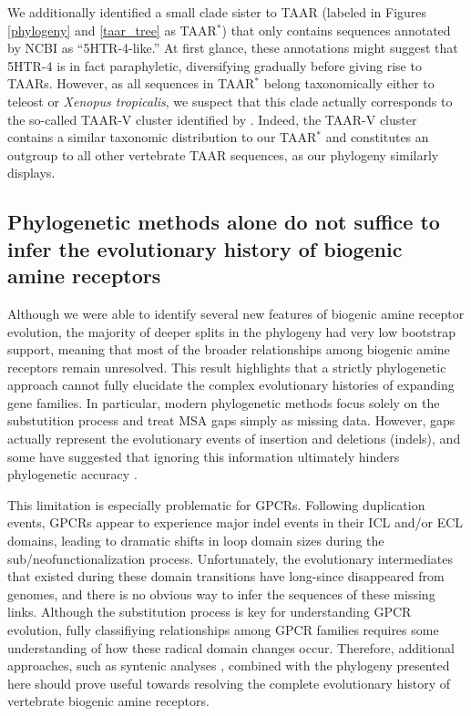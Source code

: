 \documentclass[fleqn,10pt]{wlpeerj}
\begin{document}
We additionally identified a small clade sister to TAAR (labeled in Figures \ref{phylogeny} and \ref{taar_tree} as TAAR$^\ast$) that only contains sequences annotated by NCBI as ``5HTR-4-like.'' At first glance, these annotations might suggest that 5HTR-4 is in fact paraphyletic, diversifying gradually before giving rise to TAARs. However, as all sequences in TAAR$^\ast$ belong taxonomically either to teleost or \emph{Xenopus tropicalis}, we suspect that this clade actually corresponds to the so-called TAAR-V cluster identified by \cite{Hashiguchi2007}. Indeed, the TAAR-V cluster contains a similar taxonomic distribution to our TAAR$^\ast$ and constitutes an outgroup to all other vertebrate TAAR sequences, as our phylogeny similarly displays. 

\subsection*{Phylogenetic methods alone do not suffice to infer the evolutionary history of biogenic amine receptors}
Although we were able to identify several new features of biogenic amine receptor evolution, the majority of deeper splits in the phylogeny had very low bootstrap support, meaning that most of the broader relationships among biogenic amine receptors remain unresolved. This result highlights that a strictly phylogenetic approach cannot fully elucidate the complex evolutionary histories of expanding gene families. In particular, modern phylogenetic methods focus solely on the substutition process and treat MSA gaps simply as missing data. However, gaps actually represent the evolutionary events of insertion and deletions (indels), and some have suggested that ignoring this information ultimately hinders phylogenetic accuracy \citep{Morrison2008,Loytynoja2008,Warnow2012,Luanetal2013}. 

This limitation is especially problematic for GPCRs. Following duplication events, GPCRs appear to experience major indel events in their ICL and/or ECL domains, leading to dramatic shifts in loop domain sizes during the sub/neofunctionalization process. Unfortunately, the evolutionary intermediates that existed during these domain transitions have long-since disappeared from genomes, and there is no obvious way to infer the sequences of these missing links. Although the substitution process is key for understanding GPCR evolution, fully classifiying relationships among GPCR families requires some understanding of how these radical domain changes occur. Therefore, additional approaches, such as syntenic analyses \citep{Sundstrom2010,Widmark2011,YegorovGood2012,Hwangetal2013}, combined with the phylogeny presented here should prove useful towards resolving the complete evolutionary history of vertebrate biogenic amine receptors. 
\end{document}
